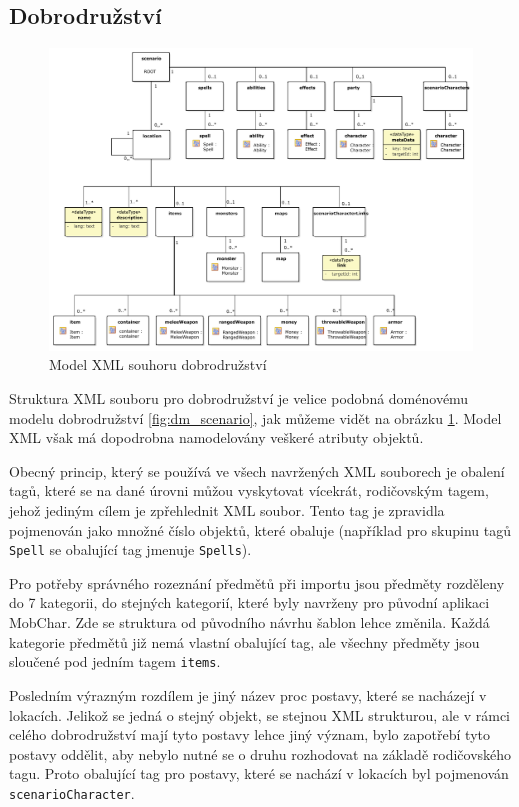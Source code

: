 \documentclass[thesis=B,czech]{resources/FITthesis}[2012/06/26]
\begin{document}
\subsection{Dobrodružství}
\begin{figure}\centering
	\includegraphics[width=1\textwidth]{images/scenarioXML}
	\caption[Model XML souhoru dobrodružství]{Model XML souhoru dobrodružství}\label{fig:xml_scenario}
\end{figure}
Struktura XML souboru pro dobrodružství je velice podobná doménovému modelu dobrodružství \ref{fig:dm_scenario}, jak můžeme vidět na obrázku \ref{fig:xml_scenario}. Model XML však má dopodrobna namodelovány veškeré atributy objektů. \par

Obecný princip, který se používá ve všech navržených XML souborech je obalení tagů, které se na dané úrovni můžou vyskytovat vícekrát, rodičovským tagem, jehož jediným cílem je zpřehlednit XML soubor. Tento tag je zpravidla pojmenován jako množné číslo objektů, které obaluje (například pro skupinu tagů \texttt{Spell} se obalující tag jmenuje \texttt{Spells}).

Pro potřeby správného rozeznání předmětů při importu jsou předměty rozděleny do 7 kategorii, do stejných kategorií, které byly navrženy pro původní aplikaci MobChar. Zde se struktura od původního návrhu šablon lehce změnila. Každá kategorie předmětů již nemá vlastní obalující tag, ale všechny předměty jsou sloučené pod jedním tagem \texttt{items}. \par

Posledním výrazným rozdílem je jiný název proc postavy, které se nacházejí v lokacích. Jelikož se jedná o stejný objekt, se stejnou XML strukturou, ale v rámci celého dobrodružství mají tyto postavy lehce jiný význam, bylo zapotřebí tyto postavy oddělit, aby nebylo nutné se o druhu rozhodovat na základě rodičovského tagu. Proto obalující tag pro postavy, které se nachází v lokacích byl pojmenován \texttt{scenarioCharacter}. 
\end{document}
